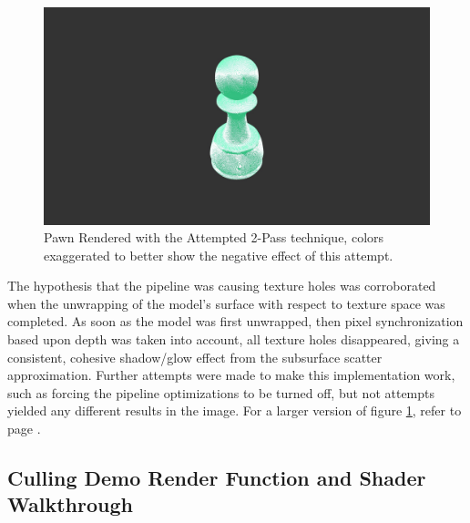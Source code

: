 \documentclass[a4paper, 12pt]{article}
\begin{document}
\begin{figure}[!htb]
	\centering
	\includegraphics[width=1.0\textwidth]{pBadRender.jpg}
	\caption{Pawn Rendered with the Attempted 2-Pass technique, colors exaggerated to better show the negative effect of this attempt.}
	\label{pic:pBadRender}
\end{figure}

\noindent The hypothesis that the pipeline was causing texture holes was
corroborated when the unwrapping of the model's surface with respect to
texture space was completed. As soon as the model was first unwrapped, then
pixel synchronization based upon depth was taken into account, all texture
holes disappeared, giving a consistent, cohesive shadow/glow effect from the
subsurface scatter approximation. Further attempts were made to make this
implementation work, such as forcing the pipeline optimizations to be turned
off, but not attempts yielded any different results in the image. For a larger
version of figure \ref{pic:pBadRender}, refer to page
\pageref{pic:bigBadRender}. 

\subsection{Culling Demo Render Function and Shader Walkthrough}
\end{document}
